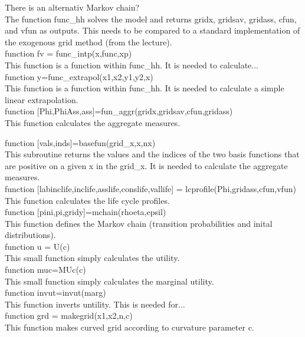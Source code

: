 \documentclass[12pt,a4paper]{article}
\begin{document}
There is an alternativ Markov chain? \\

The function func\_hh solves the model and returns gridx, gridsav, gridass, cfun, and vfun as outputs. This needs to be compared to a standard implementation of the exogenous grid method (from the lecture). \\

function fv = func\_intp(x,func,xp) \\
This function is a function within func\_hh. It is needed to calculate... \\

function y=func\_extrapol(x1,x2,y1,y2,x)\\
This function is a function within func\_hh. It is needed to calculate a simple linear extrapolation. \\


function [Phi,PhiAss,ass]=fun\_aggr(gridx,gridsav,cfun,gridass)\\
This function calculates the aggregate measures.

function [vals,inds]=basefun(grid\_x,x,nx)\\
This subroutine returns the values and the indices of the two basis functions that are positive on a given x in the grid\_x. It is needed to calculate the aggregate measures. \\

function [labinclife,inclife,asslife,conslife,vallife] = lcprofile(Phi,gridass,cfun,vfun)\\
This function calculates the life cycle profiles.\\

function [pini,pi,gridy]=mchain(rhoeta,epsil)\\
This function defines the Markov chain (transition probabilities and inital distributions). \\

function u = U(c)\\
This small function simply calculates the utility. \\

function muc=MUc(c)\\
This small function simply calculates the marginal utility. \\

function invut=invut(marg)\\
This function inverts untility. This is needed for...\\

function grd = makegrid(x1,x2,n,c) \\
This function makes curved grid according to curvature parameter c. \\
\end{document}
